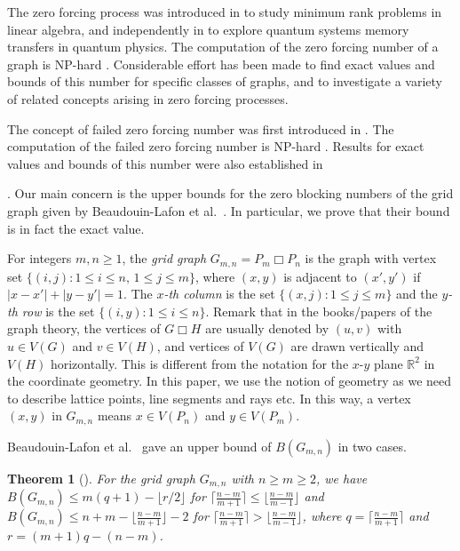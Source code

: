 \documentclass[preprint,12pt]{elsarticle}
\newtheorem{theorem}{Theorem}
\begin{document}
The zero forcing process was introduced in \cite{2008AIM}
to study minimum rank problems in linear algebra, and independently in \cite{2007bg}
to explore quantum systems memory transfers in quantum physics.
The computation of the zero forcing number of a graph is NP-hard \cite{2008a}.
Considerable effort has been made to find exact values and bounds of
this number for specific classes of graphs,
and to investigate a variety of related concepts arising in zero forcing processes.

The concept of failed zero forcing number was first introduced in \cite{2015fjs}.
The computation of the failed zero forcing number is NP-hard \cite{2017s}.
Results for exact values and bounds of this number were also established in
{\cite{2024agm,2020apnaA,2020apnaB,2016ajps,2020bccknt,2024c,2021grtn,
2024grtn,2020ksv,2023ktn,2025LLc,2023su}.
Our main concern is the upper bounds for the zero blocking numbers of the
grid graph given by Beaudouin-Lafon et al.~\cite{2020bccknt}.
In particular, we prove that their bound is in fact the exact value.

For integers $m,n\ge 1$, the {\em grid graph} $G_{m,n}=P_m\Box P_n$
is the graph with vertex set $\{(i,j):1\le i\le n,\, 1\le j\le m\}$,
where $(x,y)$ is adjacent to $(x',y')$ if $|x-x'|+|y-y'|=1$.
The {\em $x$-th column} is the set $\{(x,j):1\le j\le m\}$
and the {\em $y$-th row} is the set $\{(i,y):1\le i\le n\}$.
Remark that in the books/papers of the graph theory, the vertices of
$G\Box H$ are usually denoted by $(u, v)$ with $u\in V(G)$ and $v\in V(H)$, and
vertices of $V(G)$ are drawn vertically and $V(H)$ horizontally. This is different
from the notation for the $x$-$y$ plane $\mathbb{R}^2$
in the coordinate geometry. In this
paper, we use the notion of geometry as we need to describe lattice points, line
segments and rays etc. In this way, a vertex $(x,y)$ in $G_{m,n}$ means $x\in V(P_n)$
and $y\in V(P_m)$.

Beaudouin-Lafon et al.~\cite{2020bccknt} gave an upper bound of $B(G_{m,n})$ in two cases.

\begin{theorem}[{\cite{2020bccknt}}]\label{upper}
For the grid graph $G_{m,n}$ with $n\ge m\ge 2$,
we have $B(G_{m,n})\le m(q+1)-\lfloor r/2\rfloor$
for $\lceil\frac{n-m}{m+1}\rceil \le \lfloor\frac{n-m}{m-1}\rfloor$
and $B(G_{m,n})\le n+m-\lfloor\frac{n-m}{m+1}\rfloor-2$
for $\lceil\frac{n-m}{m+1}\rceil > \lfloor\frac{n-m}{m-1}\rfloor$,
where $q=\lceil\frac{n-m}{m+1}\rceil$ and $r=(m+1)q-(n-m)$.
\end{theorem}

}
\end{document}
